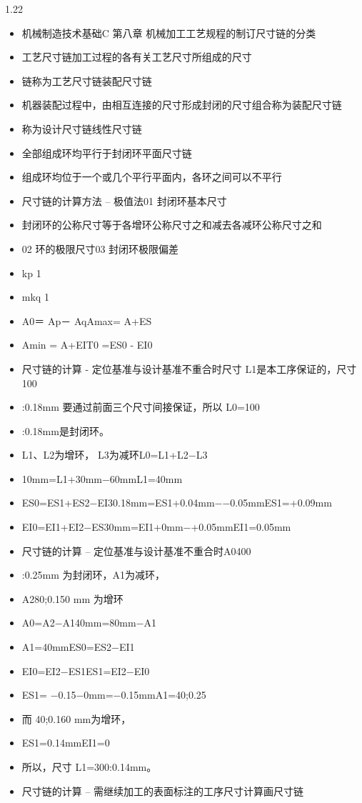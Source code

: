 \documentclass[12pt,a4paper]{article}
\begin{document}
\begin{spacing}{1.22}
\begin{itemize}[leftmargin=2.2em,label=--]
  \item 机械制造技术基础C 第八章 机械加工工艺规程的制订尺寸链的分类
  \item 工艺尺寸链加工过程的各有关工艺尺寸所组成的尺寸
  \item 链称为工艺尺寸链装配尺寸链
  \item 机器装配过程中，由相互连接的尺寸形成封闭的尺寸组合称为装配尺寸链
  \item 称为设计尺寸链线性尺寸链
  \item 全部组成环均平行于封闭环平面尺寸链
  \item 组成环均位于一个或几个平行平面内，各环之间可以不平行
  \item 尺寸链的计算方法 – 极值法01 封闭环基本尺寸
  \item 封闭环的公称尺寸等于各增环公称尺寸之和减去各减环公称尺寸之和
  \item 02 环的极限尺寸03 封闭环极限偏差
  \item kp 1
  \item mkq 1
  \item A0＝ Ap－ AqAmax= A+ES
  \item Amin = A+EIT0 =ES0 - EI0
  \item 尺寸链的计算 - 定位基准与设计基准不重合时尺寸 L1是本工序保证的，尺寸 100
  \item :0.18mm 要通过前面三个尺寸间接保证，所以 L0=100
  \item :0.18mm是封闭环。
  \item L1、L2为增环， L3为减环L0=L1+L2−L3
  \item 10mm=L1+30mm−60mmL1=40mm
  \item ES0=ES1+ES2−EI30.18mm=ES1+0.04mm−−0.05mmES1=+0.09mm
  \item EI0=EI1+EI2−ES30mm=EI1+0mm−+0.05mmEI1=0.05mm
  \item 尺寸链的计算 – 定位基准与设计基准不重合时A0400
  \item :0.25mm 为封闭环，A1为减环，
  \item A280;0.150 mm 为增环
  \item A0=A2−A140mm=80mm−A1
  \item A1=40mmES0=ES2−EI1
  \item EI0=EI2−ES1ES1=EI2−EI0
  \item ES1= −0.15−0mm=−0.15mmA1=40;0.25
  \item 而 40;0.160 mm为增环，
  \item ES1=0.14mmEI1=0
  \item 所以，尺寸 L1=300:0.14mm。
  \item 尺寸链的计算 – 需继续加工的表面标注的工序尺寸计算画尺寸链

\end{itemize}
\end{spacing}
\end{document}
